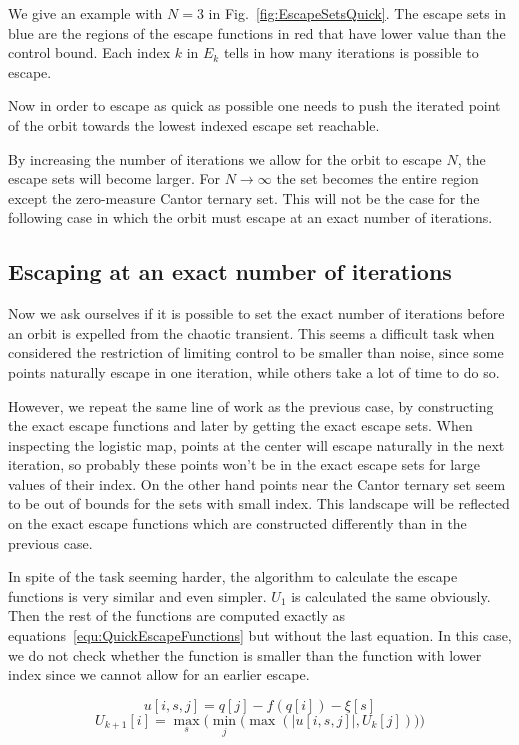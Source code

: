 We give an example with $N=3$ in Fig.~\ref{fig:EscapeSetsQuick}. The escape sets in blue are the regions of the escape functions in red that have lower value than the control bound. Each index $k$ in $E_k$ tells in how many iterations is possible to escape. 

Now in order to escape as quick as possible one needs to push the iterated point of the orbit towards the lowest indexed escape set reachable. 

By increasing the number of iterations we allow for the orbit to escape $N$, the escape sets will become larger. For $N\to\infty$ the set becomes the entire region except the zero-measure Cantor ternary set. This will not be the case for the following case in which the orbit must escape at an exact number of iterations.


\subsection{Escaping at an exact number of iterations}

Now we ask ourselves if it is possible to set the exact number of iterations before an orbit is expelled from the chaotic transient. This seems a difficult task when considered the restriction of limiting control to be smaller than noise, since some points naturally escape in one iteration, while others take a lot of time to do so. 

However, we repeat the same line of work as the previous case, by constructing the exact escape functions and later by getting the exact escape sets. When inspecting the logistic map, points at the center will escape naturally in the next iteration, so probably these points won't be in the exact escape sets for large values of their index. On the other hand points near the Cantor ternary set seem to be out of bounds for the sets with small index. This landscape will be reflected on the exact escape functions which are constructed differently than in the previous case.

In spite of the task seeming harder, the algorithm to calculate the escape functions is very similar and even simpler. $U_1$ is calculated the same obviously. Then the rest of the functions are computed exactly as equations~\ref{equ:QuickEscapeFunctions} but without the last equation. In this case, we do not check whether the function is smaller than the function with lower index since we cannot allow for an earlier escape.

\begin{equation*}
u[i,s,j] = q[j] - f(q[i]) - \xi[s]
\end{equation*}
\begin{equation}
U_{k+1}[i]=\max_s\Big(\min_j\big(\max(|u[i,s,j]|,U_k[j])\big)\Big)
\label{equ:ExactEscapeFunctions}
\end{equation}





